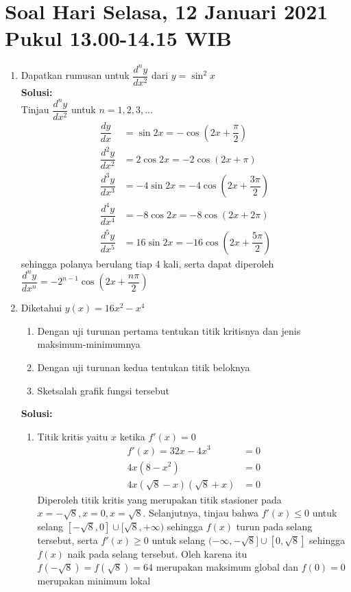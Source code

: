 \documentclass{article}
\begin{document}
\section*{Soal Hari Selasa, 12 Januari 2021 Pukul 13.00-14.15 WIB}
\begin{enumerate}
	\item Dapatkan rumusan untuk $\dfrac{d^ny}{dx^2}$ dari $y=\sin^2x$
	\\[0.2 cm] \textbf{Solusi:}\\
	Tinjau $\dfrac{d^ny}{dx^2}$ untuk $n=1,2,3,...$
	\begin{align*}
	\dfrac{dy}{dx} &= \sin 2x = - \cos \left(2x+\dfrac{\pi}{2}\right)\\
	\dfrac{d^2y}{dx^2} &= 2\cos 2x = -2\cos(2x+\pi)\\
	\dfrac{d^3y}{dx^3} &= -4\sin 2x = -4\cos\left(2x+\dfrac{3\pi}{2}\right)  \\
	\dfrac{d^4y}{dx^4} &= -8\cos 2x = -8\cos(2x+2\pi) \\
	\dfrac{d^5y}{dx^5} &= 16\sin 2x = -16\cos\left(2x+\dfrac{5\pi}{2}\right)
	\end{align*}
	sehingga polanya berulang tiap 4 kali, serta dapat  diperoleh $\dfrac{d^ny}{dx^n} = -2^{n-1}\cos\left(2x+\dfrac{n\pi}{2}\right)$
	\item Diketahui $y(x)=16x^2-x^4$
	\begin{enumerate}
		\item Dengan uji turunan pertama tentukan titik kritisnya dan jenis maksimum-minimumnya
		\item Dengan uji turunan kedua tentukan titik beloknya
		\item Sketsalah grafik fungsi tersebut
	\end{enumerate}
	\textbf{Solusi:}
	\begin{enumerate}
		\item Titik kritis yaitu $x$ ketika $f'(x)=0$
		\begin{align*}
		f'(x) = 32x-4x^3 &= 0\\
		4x(8-x^2) &= 0\\
		4x(\sqrt{8}-x)(\sqrt{8}+x) &= 0
		\end{align*}
		Diperoleh titik kritis yang merupakan titik stasioner pada $x=-\sqrt{8},x=0,x=\sqrt{8}$. Selanjutnya, tinjau bahwa $f'(x)\leq 0$ untuk selang $[-\sqrt{8},0] \cup [\sqrt{8},+\infty)$ sehingga $f(x)$ turun pada selang tersebut, serta $f'(x)\geq 0$ untuk selang $(-\infty,-\sqrt{8}]\cup[0,\sqrt{8}]$ sehingga $f(x)$ naik pada selang tersebut. Oleh karena itu $f(-\sqrt{8})=f(\sqrt{8})=64$ merupakan maksimum global dan $f(0)=0$ merupakan minimum lokal

\end{enumerate}
\end{enumerate}
\end{document}

